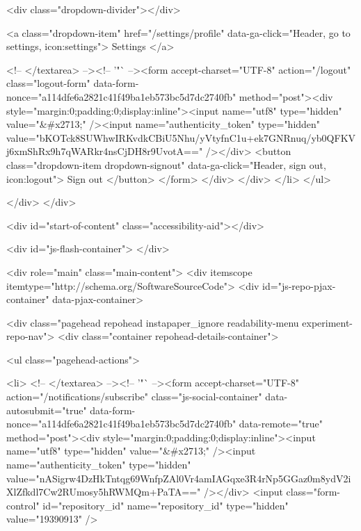         <div class="dropdown-divider"></div>

        <a class="dropdown-item" href="/settings/profile" data-ga-click="Header, go to settings, icon:settings">
          Settings
        </a>

        <!-- </textarea> --><!-- '"` --><form accept-charset="UTF-8" action="/logout" class="logout-form" data-form-nonce="a114dfe6a2821c41f49ba1eb573bc5d7dc2740fb" method="post"><div style="margin:0;padding:0;display:inline"><input name="utf8" type="hidden" value="&#x2713;" /><input name="authenticity_token" type="hidden" value="bKOTck8SUWhwIRKvdkCBiU5Nhu/yVtyfnC1u+ek7GNRnuq/yb0QFKVj6xmShRx9h7qWARkr4nsCjDH8r9UvotA==" /></div>
          <button class="dropdown-item dropdown-signout" data-ga-click="Header, sign out, icon:logout">
            Sign out
          </button>
</form>      </div>
    </div>
  </li>
</ul>


    
  </div>
</div>


      


    <div id="start-of-content" class="accessibility-aid"></div>

      <div id="js-flash-container">
</div>


    <div role="main" class="main-content">
        <div itemscope itemtype="http://schema.org/SoftwareSourceCode">
    <div id="js-repo-pjax-container" data-pjax-container>
      
<div class="pagehead repohead instapaper_ignore readability-menu experiment-repo-nav">
  <div class="container repohead-details-container">

    

<ul class="pagehead-actions">

  <li>
        <!-- </textarea> --><!-- '"` --><form accept-charset="UTF-8" action="/notifications/subscribe" class="js-social-container" data-autosubmit="true" data-form-nonce="a114dfe6a2821c41f49ba1eb573bc5d7dc2740fb" data-remote="true" method="post"><div style="margin:0;padding:0;display:inline"><input name="utf8" type="hidden" value="&#x2713;" /><input name="authenticity_token" type="hidden" value="nASigrw4DzHkTntqg69WnfpZAl0Vr4amIAGqxe3R4rNp5GGaz0m8ydV2iXlZfkdl7Cw2RUmosy5hRWMQm+PaTA==" /></div>      <input class="form-control" id="repository_id" name="repository_id" type="hidden" value="19390913" />

